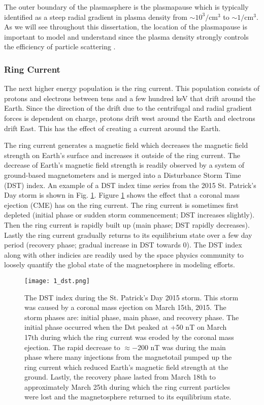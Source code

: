 The outer boundary of the plasmasphere is the plasmapause which is typically identified as a steep radial gradient in plasma density from $\sim 10^3 / \mathrm{cm}^3$ to $\sim 1 / \mathrm{cm}^3$. As we will see throughout this dissertation, the location of the plasmapause is important to model \citep[e.g.][]{O'Brien2003empirical} and understand since the plasma density strongly controls the efficiency of particle scattering \citep{Horne2005}.

\subsubsection{Ring Current}
The next higher energy population is the ring current. This population consists of protons and electrons between tens and a few hundred keV that drift around the Earth. Since the direction of the drift due to the centrifugal and radial gradient forces is dependent on charge, protons drift west around the Earth and electrons drift East. This has the effect of creating a current around the Earth. 

The ring current generates a magnetic field which decreases the magnetic field strength on Earth's surface and increases it outside of the ring current. The decrease of Earth's magnetic field strength is readily observed by a system of ground-based magnetometers and is merged into a Disturbance Storm Time (DST) index. An example of a DST index time series from the 2015 St. Patrick's Day storm is shown in Fig. \ref{Intro:dst}. Figure \ref{Intro:dst} shows the effect that a coronal mass ejection (CME) has on the ring current. The ring current is sometimes first depleted (initial phase or sudden storm commencement; DST increases slightly). Then the ring current is rapidly built up (main phase; DST rapidly decreases). Lastly the ring current gradually returns to its equilibrium state over a few day period (recovery phase; gradual increase in DST towards 0). The DST index along with other indicies are readily used by the space physics community to loosely quantify the global state of the magnetosphere in modeling efforts.

\begin{figure}
\texttt{[image: 1\_dst.png]}
\caption{The DST index during the St. Patrick's Day 2015 storm. This storm was caused by a coronal mass ejection on March 15th, 2015. The storm phases are: initial phase, main phase, and recovery phase. The initial phase occurred when the Dst peaked at +50 nT on March 17th during which the ring current was eroded by the coronal mass ejection. The rapid decrease to $\approx -200$ nT was during the main phase where many injections from the magnetotail pumped up the ring current which reduced Earth's magnetic field strength at the ground. Lastly, the recovery phase lasted from March 18th to approximately March 25th during which the ring current particles were lost and the magnetosphere returned to its equilibrium state.}
\label{Intro:dst}
\end{figure}

